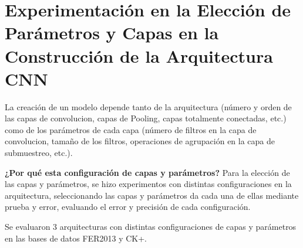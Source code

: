 \section{Experimentación en la Elección de Parámetros y Capas en la Construcción de la Arquitectura CNN}

La creación de un modelo depende tanto de la arquitectura (número y orden de las capas de convolucion, capas de Pooling, capas totalmente conectadas, etc.) como de los parámetros de cada capa (número de filtros en la capa de convolucion, tamaño de los filtros, operaciones de agrupación en la capa de submuestreo, etc.).

\textbf{¿Por qué esta configuración de capas y parámetros?} Para la elección de las capas y parámetros, se hizo experimentos con distintas configuraciones en la arquitectura, seleccionando las capas y parámetros da cada una de ellas mediante prueba y error, evaluando el error y precisión de cada configuración.

Se evaluaron 3 arquitecturas con distintas configuraciones de capas y parámetros en las bases de datos FER2013 y CK+.



